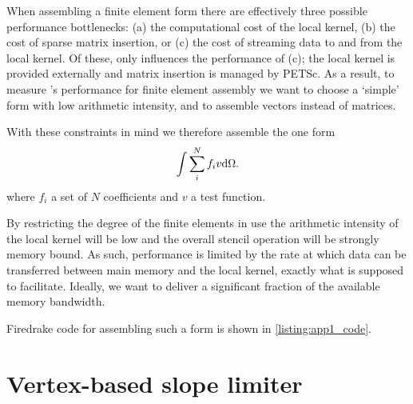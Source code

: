 \documentclass[thesis]{subfiles}
\begin{document}


When assembling a finite element form there are effectively three possible performance bottlenecks:
(a) the computational cost of the local kernel,
(b) the cost of sparse matrix insertion, or
(c) the cost of streaming data to and from the local kernel.
Of these,  only influences the performance of (c); the local kernel is provided externally and matrix insertion is managed by PETSc.
As a result, to measure 's performance for finite element assembly we want to choose a `simple' form with low arithmetic intensity, and to assemble vectors instead of matrices.

With these constraints in mind we therefore assemble the one form
\begin{equation}
  \label{eq:app1_form}
  \int \sum_i^N f_i v \textnormal{d}\Omega.
\end{equation}
where $f_i$ a set of $N$ coefficients and $v$ a test function.

By restricting the degree of the finite elements in use the arithmetic intensity of the local kernel will be low and the overall stencil operation will be strongly memory bound.
As such, performance is limited by the rate at which data can be transferred between main memory and the local kernel, exactly what  is supposed to facilitate.
Ideally, we want  to deliver a significant fraction of the available memory bandwidth.

Firedrake code for assembling such a form is shown in \cref{listing:app1_code}.




\section{Vertex-based slope limiter}
\end{document}
